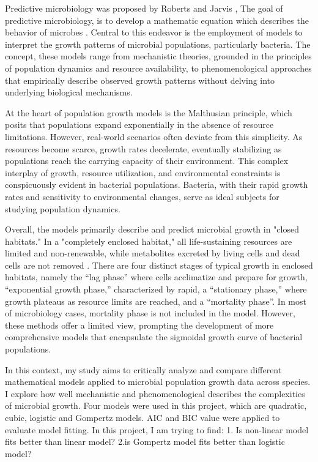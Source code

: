 \documentclass{article}
\begin{document}
Predictive microbiology was proposed by Roberts and Jarvis
\cite{ross2003}, The goal of predictive microbiology, is to develop a mathematic equation which describes the behavior of microbes \cite{md2011}. Central to this endeavor is the employment of models to interpret the growth patterns of microbial populations, particularly bacteria. The concept, these models range from mechanistic theories, grounded in the principles of population dynamics and resource availability, to phenomenological approaches that empirically describe observed growth patterns without delving into underlying biological mechanisms. 


At the heart of population growth models is the Malthusian principle\cite{mcatee1936}, which posits that populations expand exponentially in the absence of resource limitations. However, real-world scenarios often deviate from this simplicity. As resources become scarce, growth rates decelerate, eventually stabilizing as populations reach the carrying capacity of their environment. This complex interplay of growth, resource utilization, and environmental constraints is conspicuously evident in bacterial populations. Bacteria, with their rapid growth rates and sensitivity to environmental changes, serve as ideal subjects for studying population dynamics.

Overall, the models primarily describe and predict microbial growth in "closed habitats." In a "completely enclosed habitat," all life-sustaining resources are limited and non-renewable, while metabolites excreted by living cells and dead cells are not removed \cite{peleg2011}. There are four distinct stages of typical growth in enclosed habitats, namely the “lag phase” where cells acclimatize and prepare for growth, “exponential growth phase,” characterized by rapid, a “stationary phase,” where growth plateaus as resource limits are reached, and a “mortality phase”\cite{peleg2011}. In most of microbiology cases, mortality phase is not included in the model. However, these methods offer a limited view, prompting the development of more comprehensive models that encapsulate the sigmoidal growth curve of bacterial populations.



In this context, my study aims to critically analyze and compare different mathematical models applied to microbial population growth data across species. I explore how well mechanistic and phenomenological describes the complexities of microbial growth. Four models were used in this project, which are quadratic, cubic, logistic and Gompertz models. AIC and BIC value were applied to evaluate model fitting. In this project, I am trying to find: 1. Is non-linear model fits better than linear model? 2.is Gompertz model fits better than logistic model?
\end{document}
